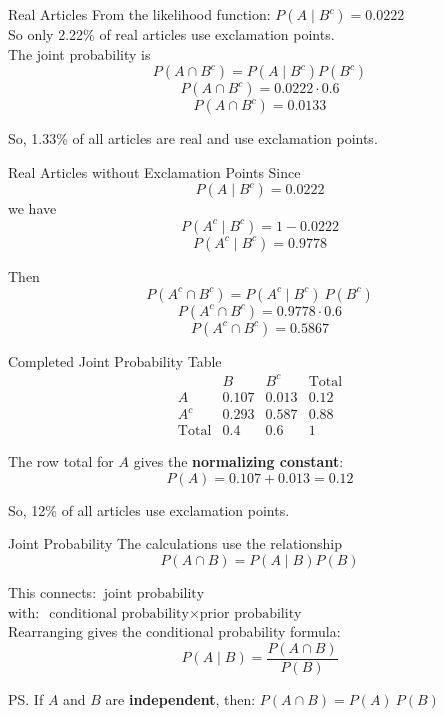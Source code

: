 \documentclass[12pt]{beamer}
\begin{document}
\begin{frame}{}
\begin{block}{Real Articles}
From the likelihood function: $P(A\mid B^c)=0.0222$\\

So only 2.22\% of real articles use exclamation points.\\

The joint probability is
\[
P(A \cap B^c)=P(A\mid B^c)P(B^c)
\]
\[
P(A \cap B^c)=0.0222 \cdot 0.6
\]
\[
P(A \cap B^c)=0.0133
\]

So, 1.33\% of all articles are real and use exclamation points.
\end{block}
\end{frame}

\begin{frame}{}
\begin{block}{Real Articles without Exclamation Points}
Since
\[
P(A\mid B^c)=0.0222
\]
we have
\[
P(A^c\mid B^c)=1-0.0222
\]
\[
P(A^c\mid B^c)=0.9778
\]

Then
\[
P(A^c \cap B^c)=P(A^c\mid B^c) ~ P(B^c)
\]
\[
P(A^c \cap B^c)=0.9778 \cdot 0.6
\]
\[
P(A^c \cap B^c)=0.5867
\]
\end{block}
\end{frame}

\begin{frame}{}
\begin{block}{Completed Joint Probability Table}
\[
\begin{array}{c|ccc}
& B & B^c & \text{Total} \\
\hline
A   & 0.107 & 0.013 & 0.12 \\
A^c & 0.293 & 0.587 & 0.88 \\
\hline
\text{Total} & 0.4 & 0.6 & 1
\end{array}
\]

The row total for \(A\) gives the \textbf{normalizing constant}:
\[
P(A) = 0.107 + 0.013 = \boxed{0.12}
\]

So, 12\% of all articles use exclamation points.
\end{block}
\end{frame}

\begin{frame}{}
\begin{block}{Joint Probability}
The calculations use the relationship
\[
P(A \cap B)=P(A\mid B)P(B)
\]

This connects: $~ \text{joint probability}$\\

with: $~ \text{conditional probability} \times \text{prior probability}$\\

Rearranging gives the conditional probability formula:
\[
P(A\mid B)=\frac{P(A \cap B)}{P(B)}
\]

\textcolor{aggiemaroon!70}{
PS. If \(A\) and \(B\) are \textbf{independent}, then:
$P(A \cap B) = P(A) ~ P(B)$
}
\end{block}
\end{frame}
\end{document}
